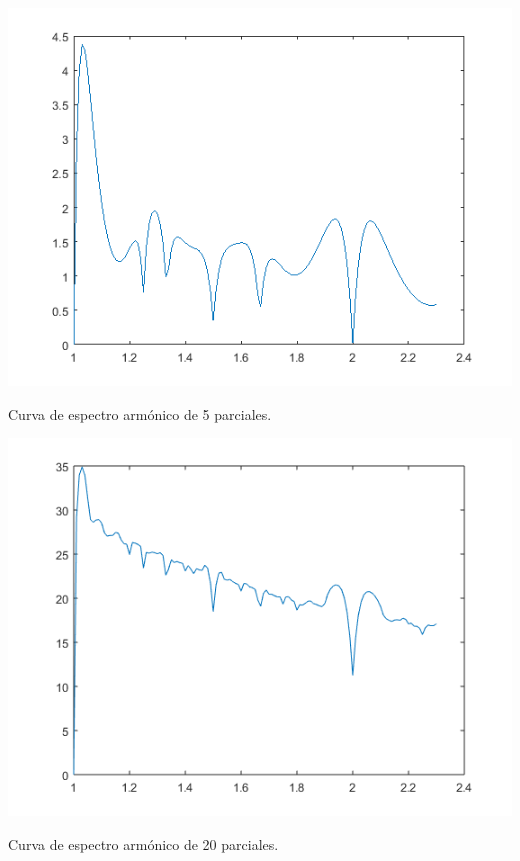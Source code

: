 \documentclass[11pt,a4paper]{article}
\begin{document}
	\begin{center}\includegraphics[scale=.65]{Espectro1_5.png}
	
	Curva de espectro armónico de 5 parciales.\end{center}
	
    \begin{center}\includegraphics[scale=.65]{Espectro1-20.png}
	
	Curva de espectro armónico de 20 parciales.\end{center}
	
\end{document}
